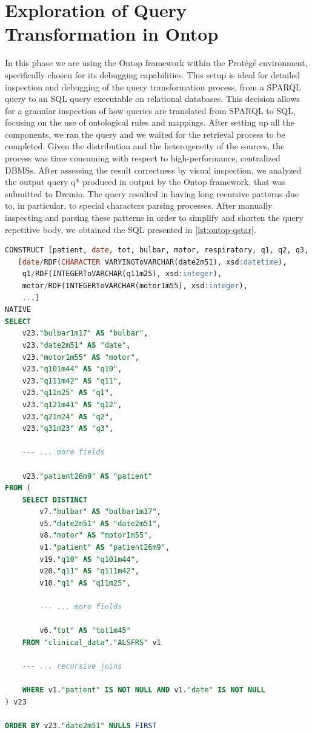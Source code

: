 \section{Exploration of Query Transformation in Ontop}
In this phase we are using the Ontop framework within the Protégé environment, specifically chosen for its debugging capabilities. This setup is ideal for detailed inspection and debugging of the query transformation process, from a \ac{SPARQL} query to an \ac{SQL} query executable on relational databases. This decision allows for a granular inspection of how queries are translated from \ac{SPARQL} to \ac{SQL}, focusing on the use of ontological rules and mappings. 
After setting up all the components, we ran the query and we waited for the retrieval process to be completed. Given the distribution and the heterogeneity of the sources, the process was time consuming with respect to high-performance, centralized \ac{DBMS}s. After assessing the result correctness by visual inspection, we analyzed the output query q* produced in output by the Ontop framework, that was submitted to Dremio.
The query resulted in having long recursive patterns due to, in particular, to special characters parsing processes.
After manually inspecting and parsing these patterns in order to simplify and shorten the query repetitive body, we obtained the \ac{SQL} presented in \ref{lst:ontop-qstar}.
\begin{lstlisting}[language=SQL, caption={Parsed \ac{SQL} Translation of the Original \ac{SPARQL} Query}, label={lst:ontop-qstar}]
CONSTRUCT [patient, date, tot, bulbar, motor, respiratory, q1, q2, q3, q4, q5, q6, q7, q8, q9, q10, q11, q12]
   [date/RDF(CHARACTER VARYINGToVARCHAR(date2m51), xsd:datetime),
    q1/RDF(INTEGERToVARCHAR(q11m25), xsd:integer),
    motor/RDF(INTEGERToVARCHAR(motor1m55), xsd:integer),
    ...]
NATIVE
SELECT
    v23."bulbar1m17" AS "bulbar",
    v23."date2m51" AS "date",
    v23."motor1m55" AS "motor",
    v23."q101m44" AS "q10",
    v23."q111m42" AS "q11",
    v23."q11m25" AS "q1",
    v23."q121m41" AS "q12",
    v23."q21m24" AS "q2",
    v23."q31m23" AS "q3",

    --- ... more fields

    v23."patient26m9" AS "patient"
FROM (
    SELECT DISTINCT
        v7."bulbar" AS "bulbar1m17",
        v5."date2m51" AS "date2m51",
        v8."motor" AS "motor1m55",
        v1."patient" AS "patient26m9",
        v19."q10" AS "q101m44",
        v20."q11" AS "q111m42",
        v10."q1" AS "q11m25",

        --- ... more fields
        
        v6."tot" AS "tot1m45"
    FROM "clinical_data"."ALSFRS" v1
    
    --- ... recursive joins

    WHERE v1."patient" IS NOT NULL AND v1."date" IS NOT NULL
) v23

ORDER BY v23."date2m51" NULLS FIRST
\end{lstlisting}
